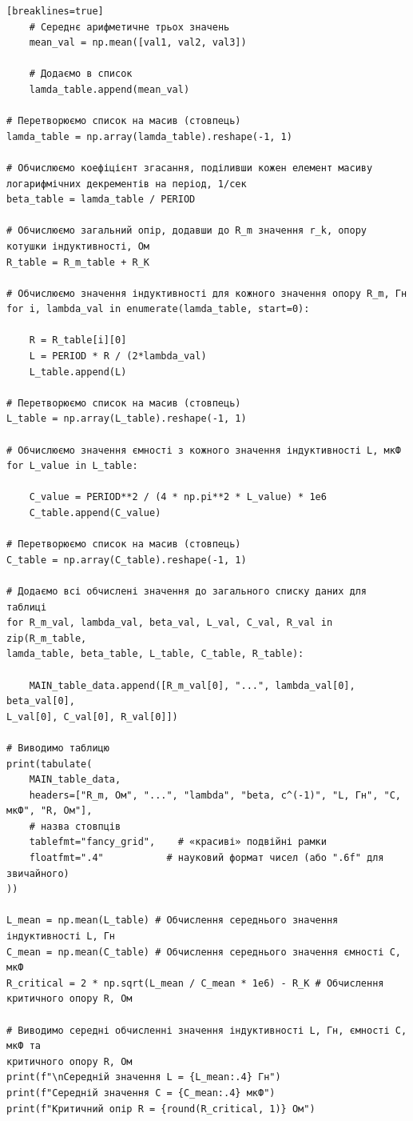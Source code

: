\documentclass[12pt,a4paper]{article}
\begin{document}
{\begin{verbatim}[breaklines=true]
    # Середнє арифметичне трьох значень
    mean_val = np.mean([val1, val2, val3])

    # Додаємо в список
    lamda_table.append(mean_val)

# Перетворюємо список на масив (стовпець)
lamda_table = np.array(lamda_table).reshape(-1, 1)

# Обчислюємо коефіцієнт згасання, поділивши кожен елемент масиву
логарифмічних декрементів на період, 1/сек
beta_table = lamda_table / PERIOD

# Обчислюємо загальний опір, додавши до R_m значення r_k, опору котушки індуктивності, Ом
R_table = R_m_table + R_K

# Обчислюємо значення індуктивності для кожного значення опору R_m, Гн
for i, lambda_val in enumerate(lamda_table, start=0):

    R = R_table[i][0]
    L = PERIOD * R / (2*lambda_val)
    L_table.append(L)

# Перетворюємо список на масив (стовпець)
L_table = np.array(L_table).reshape(-1, 1)

# Обчислюємо значення ємності з кожного значення індуктивності L, мкФ
for L_value in L_table:

    C_value = PERIOD**2 / (4 * np.pi**2 * L_value) * 1e6
    C_table.append(C_value)

# Перетворюємо список на масив (стовпець)
C_table = np.array(C_table).reshape(-1, 1)

# Додаємо всі обчислені значення до загального списку даних для таблиці
for R_m_val, lambda_val, beta_val, L_val, C_val, R_val in zip(R_m_table,
lamda_table, beta_table, L_table, C_table, R_table):

    MAIN_table_data.append([R_m_val[0], "...", lambda_val[0], beta_val[0],
L_val[0], C_val[0], R_val[0]])

# Виводимо таблицю
print(tabulate(
    MAIN_table_data,
    headers=["R_m, Ом", "...", "lambda", "beta, c^(-1)", "L, Гн", "C, мкФ", "R, Ом"],
    # назва стовпців
    tablefmt="fancy_grid",    # «красиві» подвійні рамки
    floatfmt=".4"           # науковий формат чисел (або ".6f" для звичайного)
))

L_mean = np.mean(L_table) # Обчислення середнього значення індуктивності L, Гн
C_mean = np.mean(C_table) # Обчислення середнього значення ємності C, мкФ
R_critical = 2 * np.sqrt(L_mean / C_mean * 1e6) - R_K # Обчислення критичного опору R, Ом

# Виводимо середні обчисленні значення індуктивності L, Гн, ємності C, мкФ та
критичного опору R, Ом
print(f"\nСередній значення L = {L_mean:.4} Гн")
print(f"Середній значення C = {C_mean:.4} мкФ")
print(f"Критичний опір R = {round(R_critical, 1)} Ом")
    \end{verbatim}}
\end{document}
